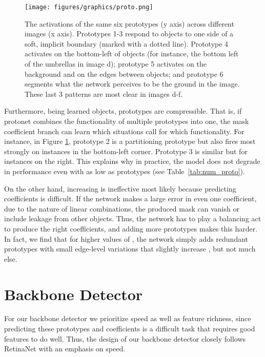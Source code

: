 \documentclass[10pt,journal,compsoc]{IEEEtran}
\begin{document}
    \begin{figure}[t!]
    \centering
    \texttt{[image: figures/graphics/proto.png]}
\caption{ The activations of the same six prototypes (y axis) across different images (x axis). Prototypes 1-3 respond to objects to one side of a soft, implicit boundary (marked with a dotted line). Prototype 4 activates on the bottom-left of objects (for instance, the bottom left of the umbrellas in image d); prototype 5 activates on the background and on the edges between objects; and prototype 6 segments what the network perceives to be the ground in the image. These last 3 patterns are most clear in images d-f.}
\label{fig:behavior}
    
\end{figure} 
Furthermore, being learned objects, prototypes are compressible. That is, if protonet combines the functionality of multiple prototypes into one, the mask coefficient branch can learn which situations call for which functionality. For instance, in Figure \ref{fig:behavior}, prototype 2 is a partitioning prototype but also fires most strongly on instances in the bottom-left corner. Prototype 3 is similar but for instances on the right. This explains why in practice, the model does not degrade in performance even with as low as  prototypes (see Table~\ref{tab:num_proto}).

On the other hand, increasing  is ineffective most likely because predicting coefficients is difficult. If the network makes a large error in even one coefficient, due to the nature of linear combinations, the produced mask can vanish or include leakage from other objects. Thus, the network has to play a balancing act to produce the right coefficients, and adding more prototypes makes this harder. In fact, we find that for higher values of , the network simply adds redundant prototypes with small edge-level variations that slightly increase , but not much else.
\section{Backbone Detector}

For our backbone detector we prioritize speed as well as feature richness, since predicting these prototypes and coefficients is a difficult task that requires good features to do well. Thus, the design of our backbone detector closely follows RetinaNet \cite{retinanet} with an emphasis on speed.
\end{document}
